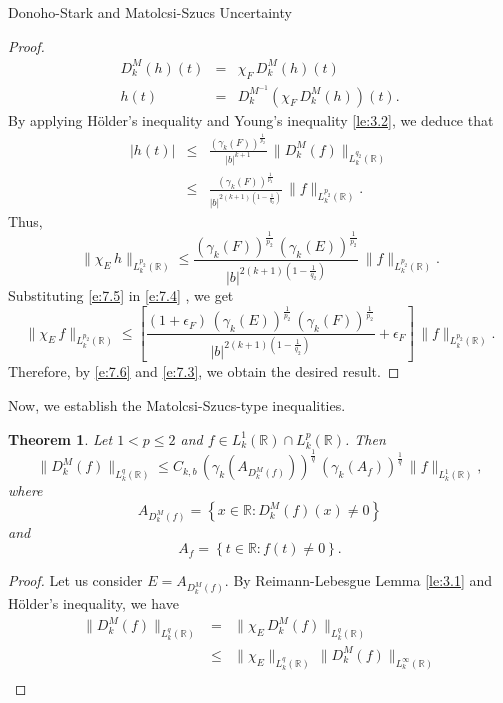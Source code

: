 \documentclass[12pt,a4paper,reqno]{amsproc}
\newtheorem{theorem}{Theorem}[section]
\theoremstyle{definition}
\theoremstyle{remark}
\numberwithin{equation}{section}
\begin{document}
\begin{subsection}{Donoho-Stark and Matolcsi-Szucs Uncertainty}
\begin{proof}
\begin{eqnarray*}
  D_k^{M}(h)(t) &=& \chi_{F}\, D_k^M(h)(t)\\
h(t) &=& D_k^{M^{-1}}(\chi_{F}\, D_k^M(h))(t).
\end{eqnarray*}
By applying H{\"o}lder's inequality and Young's inequality \eqref{le:3.2}, we deduce that
\begin{eqnarray*}
    |h(t)|&\le &\frac{(\gamma_k(F))^{\frac{1}{p_2}}}{|b|^{k+1}}\,\|D_k^M(f)\|_{L_k^{q_2}(\mathbb{R})}\\
    &\le& \frac{(\gamma_k(F))^{\frac{1}{p_2}}}{|b|^{2(k+1)\left(1-\frac{1}{q_2}\right)}}\, \|f\|_{L_k^{p_2}(\mathbb{R})}.
\end{eqnarray*}
Thus, 
\begin{equation} \label{e:7.5}
\|\chi_E\,h\|_{L_k^{p_2}(\mathbb{R})} \le \frac{(\gamma_k(F))^{\frac{1}{p_2}}\,(\gamma_k(E))^{\frac{1}{p_2}}}{|b|^{2(k+1)\left(1-\frac{1}{q_2}\right)}}\, \|f\|_{L_k^{p_2}(\mathbb{R})}.   
\end{equation}
Substituting  \eqref{e:7.5} in \eqref{e:7.4} , we get
\begin{equation}\label{e:7.6}
    \|\chi_E\,f\|_{L_k^{p_2}(\mathbb{R})}\le  \left[\frac{(1+\epsilon_{F})\,(\gamma_k(E))^{\frac{1}{p_2}}\, (\gamma_k(F))^{\frac{1}{p_2}}}{|b|^{2(k+1)\left(1-\frac{1}{q_2}\right)}}+\epsilon_{F}\right] \, \|f\|_{L_k^{p_2}(\mathbb{R})} .
\end{equation}
Therefore, by \eqref{e:7.6} and \eqref{e:7.3}, we obtain the desired result.
\end{proof}
Now, we establish the Matolcsi-Szucs-type inequalities.
\begin{theorem} Let $1<p\le 2$ and $f\in   L_k^1(\mathbb{R})\cap L_k^p(\mathbb{R})$.  Then
\begin{equation*}
    \|D_k^M(f)\|_{L_k^{q}(\mathbb{R})} \le C_{k,b}\, (\gamma_k(A_{D_k^M(f)}))^{\frac{1}{q}}\, (\gamma_k(A_f))^{\frac{1}{q}}\, \|f\|_{L_k^1(\mathbb{R})},
\end{equation*}
where  $$A_{D_k^M(f)}= \left\{x\in \mathbb{R}: D_k^M(f)(x) \neq 0\right\}$$ and $$A_f = \left\{ t
\in \mathbb{R}:f(t)\neq0\right\}.$$
\end{theorem}
\begin{proof}
    Let us consider $E=A_{D_k^M(f)}$. By Reimann-Lebesgue Lemma \ref{le:3.1} and H{\"o}lder's inequality, we have
    \begin{eqnarray*}    \|D_k^M(f)\|_{L^{q}_k(\mathbb{R})}&=& \|\chi_E\, D_k^M(f)\|_{L_k^{q}(\mathbb{R})}\\
        &\le& \|\chi_E\|_{L_k^{q}(\mathbb{R})}\,\|D_k^M(f)\|_{L_k^{\infty}(\mathbb{R})}\\

\end{eqnarray*}
\end{proof}
\end{subsection}
\end{document}
